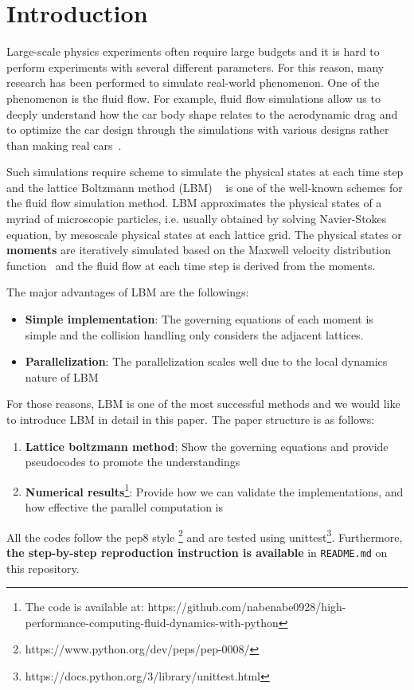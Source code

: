 \chapter{Introduction}
\vspace{-8mm}
Large-scale physics experiments often require large budgets
and it is hard to perform experiments with several different parameters.
For this reason, many research has been performed to simulate real-world 
phenomenon.
One of the phenomenon is the fluid flow.
For example, fluid flow simulations allow us to deeply understand
how the car body shape relates to the aerodynamic drag
and to optimize the car design through the simulations with
various designs rather than making real cars~\cite{padagannavar2016automotive}.

Such simulations require scheme to simulate the physical states
at each time step
and the lattice Boltzmann method (LBM) ~\cite{timm2016lattice}
is one of the well-known
schemes for the fluid flow simulation method.
LBM approximates the physical states of a myriad of microscopic particles,
i.e. usually obtained by solving Navier-Stokes equation,
by mesoscale physical states at each lattice grid.
The physical states or {\bf moments} are iteratively simulated based on
the Maxwell velocity distribution function~\cite{huang1963statistical} and
the fluid flow at each time step is derived from the moments.

The major advantages of LBM are the followings:
\begin{itemize}
  \item {\bf Simple implementation}: The governing equations of each moment
  is simple and the collision handling only considers the adjacent lattices. 
  \item {\bf Parallelization}: The parallelization scales well due to
  the local dynamics nature of LBM~\cite{raabe2004overview}
\end{itemize}
For those reasons, LBM is one of the most successful methods and
we would like to introduce LBM in detail in this paper.
The paper structure is as follows:
\begin{enumerate}
  \item {\bf Lattice boltzmann method}; Show the governing equations and 
  provide pseudocodes to promote the understandings
  \item {\bf Numerical results}\footnote{
  The code is available at:
    https://github.com/nabenabe0928/high-performance-computing-fluid-dynamics-with-python
  }: Provide how we can validate the implementations,
  and how effective the parallel computation is
\end{enumerate}
All the codes follow the pep8 style
\footnote{https://www.python.org/dev/peps/pep-0008/} and 
are tested using
unittest\footnote{https://docs.python.org/3/library/unittest.html}.
Furthermore, {\bf the step-by-step reproduction instruction is available}
in {\tt README.md} on this repository.
